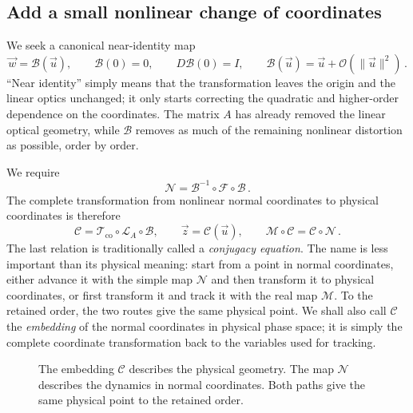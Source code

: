 \subsection{Add a small nonlinear change of coordinates}

We seek a canonical near-identity map
\begin{equation}
    \vec w = \mathcal B(\vec u),\qquad
    \mathcal B(0) = 0,\qquad D\mathcal B(0) = I,
    \qquad
    \mathcal B(\vec u) = \vec u + \mathcal O(\|\vec u\|^2)\,.
\end{equation}
``Near identity'' simply means that the transformation leaves the origin and
the linear optics unchanged; it only starts correcting the quadratic and
higher-order dependence on the coordinates.  The matrix $A$ has already
removed the linear optical geometry, while $\mathcal B$ removes as much of the
remaining nonlinear distortion as possible, order by order.

We require
\begin{equation}\label{eq:nnf-conjugacy}
    \mathcal N = \mathcal B^{-1}\circ\mathcal F\circ\mathcal B\,.
\end{equation}
The complete transformation from nonlinear normal coordinates to physical
coordinates is therefore
\begin{equation}\label{eq:nnf-physical-embedding}
    \mathcal C = \mathcal T_{\mathrm{co}}\circ\mathcal L_A\circ\mathcal B,
    \qquad \vec z = \mathcal C(\vec u),\qquad
    \mathcal M\circ\mathcal C = \mathcal C\circ\mathcal N\,.
\end{equation}
The last relation is traditionally called a \emph{conjugacy equation}.  The
name is less important than its physical meaning: start from a point in normal
coordinates, either advance it with the simple map $\mathcal N$ and then
transform it to physical coordinates, or first transform it and track it with
the real map $\mathcal M$.  To the retained order, the two routes give the
same physical point.  We shall also call $\mathcal C$ the \emph{embedding} of
the normal coordinates in physical phase space; it is simply the complete
coordinate transformation back to the variables used for tracking.

\begin{figure}[htbp]
\centering
{}
\caption{The embedding $\mathcal C$ describes the physical geometry.
The map $\mathcal N$ describes the dynamics in normal coordinates.
Both paths give the same physical point to the retained order.}
\label{fig:nnf-conjugacy}
\end{figure}


